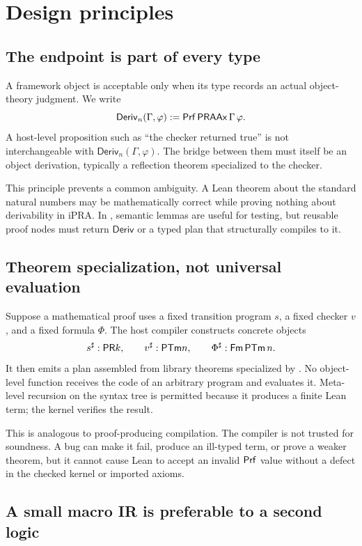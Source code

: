 \section{Design principles}\label{sec:design}

\subsection{The endpoint is part of every type}

A framework object is acceptable only when its type records an actual object-theory judgment.  We
write
\[
  \mathsf{Deriv}_n(\Gamma,\varphi)
  := \mathsf{Prf}\,\mathsf{PRAAx}\,\Gamma\,\varphi.
\]
A host-level proposition such as ``the checker returned true'' is not interchangeable with
\(\mathsf{Deriv}_n(\Gamma,\varphi)\).  The bridge between them must itself be an object derivation,
typically a reflection theorem specialized to the checker.

This principle prevents a common ambiguity.  A Lean theorem about the standard natural numbers may
be mathematically correct while proving nothing about derivability in iPRA.  In \TAPIR{}, semantic
lemmas are useful for testing, but reusable proof nodes must return \(\mathsf{Deriv}\) or a typed plan
that structurally compiles to it.

\subsection{Theorem specialization, not universal evaluation}

Suppose a mathematical proof uses a fixed transition program \(s\), a fixed checker \(v\), and a
fixed formula \(\Phi\).  The host compiler constructs concrete objects
\[
  s^{\sharp}:\mathsf{PR} k,\qquad v^{\sharp}:\mathsf{PTm} n,\qquad \Phi^{\sharp}:\mathsf{Fm}\,\mathsf{PTm}\,n.
\]
It then emits a plan assembled from library theorems specialized by
.  No object-level function receives the code of an arbitrary program and evaluates
it.  Meta-level recursion on the syntax tree is permitted because it produces a finite Lean term;
the kernel verifies the result.

This is analogous to proof-producing compilation.  The compiler is not trusted for soundness.  A
bug can make it fail, produce an ill-typed term, or prove a weaker theorem, but it cannot cause Lean
to accept an invalid \(\mathsf{Prf}\) value without a defect in the checked kernel or imported axioms.

\subsection{A small macro IR is preferable to a second logic}

